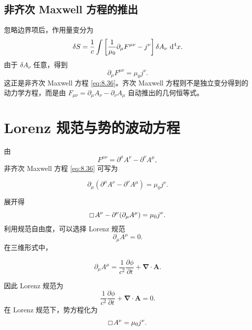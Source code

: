 \subsection{非齐次 Maxwell 方程的推出}

忽略边界项后，作用量变分为
\begin{equation}
	\delta S
	=
	\frac{1}{c}
	\int
	\left[
	\frac{1}{\mu_{0}}\partial_{\mu}F^{\mu\nu}
	-
	j^{\nu}
	\right]
	\delta A_{\nu}\,\mathop{}\!\mathrm{d}^{4}x.
	\label{eq:8.53}
\end{equation}
由于 $\delta A_{\nu}$ 任意，得到
\begin{equation}
	\partial_{\mu}F^{\mu\nu}
	=
	\mu_{0}j^{\nu}.
	\label{eq:8.54}
\end{equation}
这正是非齐次 Maxwell 方程 \eqref{eq:8.36}。齐次 Maxwell 方程则不是独立变分得到的动力学方程，而是由 $F_{\mu\nu}=\partial_{\mu}A_{\nu}-\partial_{\nu}A_{\mu}$ 自动推出的几何恒等式。

\section{Lorenz 规范与势的波动方程}

由
\begin{equation}
	F^{\mu\nu}
	=
	\partial^{\mu}A^{\nu}-\partial^{\nu}A^{\mu},
	\label{eq:8.55}
\end{equation}
非齐次 Maxwell 方程 \eqref{eq:8.36} 可写为

\[
\partial_{\mu}(\partial^{\mu}A^{\nu}-\partial^{\nu}A^{\mu})
=
\mu_{0}j^{\nu}.
\]

展开得
\begin{equation}
	\dalembert A^{\nu}
	-
	\partial^{\nu}(\partial_{\mu}A^{\mu})
	=
	\mu_{0}j^{\nu}.
	\label{eq:8.57}
\end{equation}
利用规范自由度，可以选择 Lorenz 规范
\begin{equation}
	\partial_{\mu}A^{\mu}=0.
	\label{eq:8.58}
\end{equation}
在三维形式中，

\[
\partial_{\mu}A^{\mu}
=
\frac{1}{c^{2}}\frac{\partial\phi}{\partial t}
+
\bm{\nabla}\cdot\bm{A}.
\]

因此 Lorenz 规范为
\begin{equation}
	\frac{1}{c^{2}}\frac{\partial\phi}{\partial t}
	+
	\bm{\nabla}\cdot\bm{A}=0.
	\label{eq:8.60}
\end{equation}
在 Lorenz 规范下，势方程化为
\begin{equation}
	\dalembert A^{\nu}=\mu_{0}j^{\nu}.
	\label{eq:8.61}
\end{equation}

